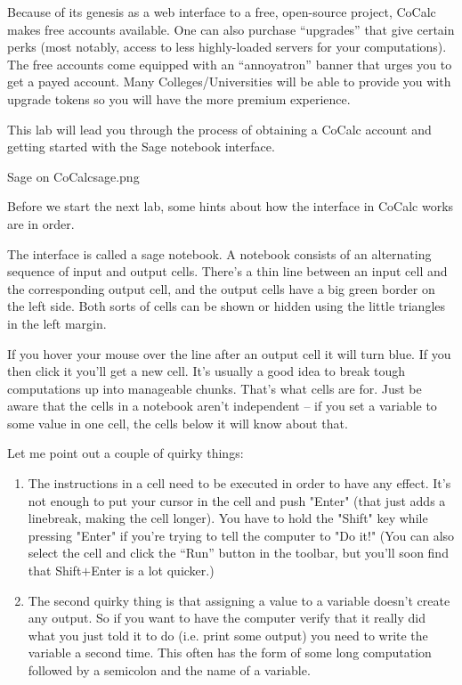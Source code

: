 Because of its genesis as a web interface to a free, open-source project, CoCalc makes free accounts available.  One can also purchase ``upgrades'' that give certain perks (most notably, access to less highly-loaded servers for your computations).  The free accounts come equipped with an ``annoyatron'' banner that urges you to get a payed account.  Many Colleges/Universities will be able to provide you with upgrade tokens so you will have the more premium experience.


This lab will lead you through the process of obtaining a CoCalc account and getting started with the Sage notebook interface.

\clearpage
\begin{worksheet}{7}{Sage on CoCalc}{sage.png}

\end{worksheet}
\clearpage


Before we start the next lab, some hints about how the interface in CoCalc works are in order.

The interface is called a sage notebook. A notebook consists of an alternating sequence of input and output cells. There's a thin line between an input cell and the corresponding output cell, and the output cells have a big green border on the left side. Both sorts of cells can be shown or hidden using the little triangles in the left margin. 

If you hover your mouse over the line after an output cell it will turn blue. If you then click it you'll get a new cell. It's usually a good idea to break tough computations up into manageable chunks. That's what cells are for. Just be aware that the cells in a notebook aren't independent -- if you set a variable to some value in one cell, the cells below it will know about that.

Let me point out a couple of quirky things:

\begin{enumerate}
	\item The instructions in a cell need to be executed in order to have any effect. It's not enough to put your cursor in the cell and push "Enter" (that just adds a linebreak, making the cell longer). You have to hold the "Shift" key while pressing "Enter" if you're trying to tell the computer to "Do it!"  (You can also select the cell and click the ``Run'' button in the toolbar, but you'll soon find that Shift$+$Enter is a lot quicker.)
	\item The second quirky thing is that assigning a value to a variable doesn't create any output. So if you want to have the computer verify that it really did what you just told it to do (i.e. print some output) you need to write the variable a second time.  This often has the form of some long computation followed by a semicolon and the name of a variable.
\end{enumerate}

